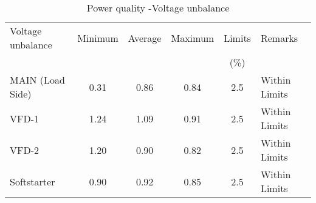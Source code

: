 \begin{table}[!htb]
	\caption{Power quality -Voltage unbalance}
	\label{tbl_ch04_elecaudit_powerquality_voltageunbalance}
	{\scriptsize
		
	\begin{tabular}{l|l|l|l|l|l}
\hline
Voltage unbalance & \multicolumn{1}{c|}{Minimum} & \multicolumn{1}{c|}{Average} & \multicolumn{1}{c|}{Maximum} & \multicolumn{1}{c|}{Limits} & Remarks \\ 
& \multicolumn{1}{c|}{} & \multicolumn{1}{c|}{} & \multicolumn{1}{c|}{} & \multicolumn{1}{c|}{(\%)} &  \\ 
\hline
MAIN (Load Side) & \multicolumn{1}{c|}{0.31} & \multicolumn{1}{c|}{0.86} & \multicolumn{1}{c|}{0.84} & \multicolumn{1}{c|}{2.5} & Within  Limits \\ 
\hline
VFD-1 & \multicolumn{1}{c|}{1.24} & \multicolumn{1}{c|}{1.09} & \multicolumn{1}{c|}{0.91} & \multicolumn{1}{c|}{2.5} & Within  Limits \\ 
\hline
VFD-2 & \multicolumn{1}{c|}{1.20} & \multicolumn{1}{c|}{0.90} & \multicolumn{1}{c|}{0.82} & \multicolumn{1}{c|}{2.5} & Within  Limits \\ 
\hline
Softstarter & \multicolumn{1}{c|}{0.90} & \multicolumn{1}{c|}{0.92} & \multicolumn{1}{c|}{0.85} & \multicolumn{1}{c|}{2.5} & Within  Limits \\ 
\hline
	\end{tabular}
		
	}%
\end{table}